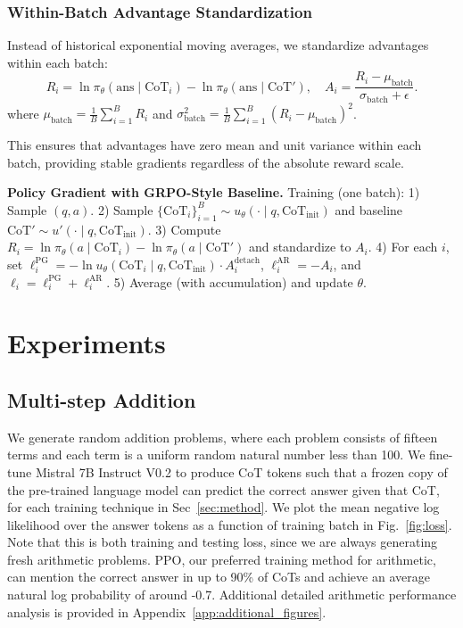 \documentclass{article} %
\begin{document}
\subsubsection{Within-Batch Advantage Standardization}
Instead of historical exponential moving averages, we standardize advantages within each batch:
\[R_i=\ln \pi_\theta(\text{ans} \mid \text{CoT}_i) - \ln \pi_\theta(\text{ans} \mid \text{CoT}'),\quad
A_i=\frac{R_i - \mu_{\text{batch}}}{\sigma_{\text{batch}} + \epsilon}.\]
where $\mu_{\text{batch}} = \frac{1}{B}\sum_{i=1}^B R_i$ and $\sigma_{\text{batch}}^2 = \frac{1}{B}\sum_{i=1}^B (R_i - \mu_{\text{batch}})^2$.

This ensures that advantages have zero mean and unit variance within each batch, providing stable gradients regardless of the absolute reward scale.

\noindent\textbf{Policy Gradient with GRPO-Style Baseline.} Training (one batch): 1) Sample $(q,a)$. 2) Sample $\{\text{CoT}_i\}_{i=1}^B\sim u_\theta(\cdot\mid q,\text{CoT}_{\text{init}})$ and baseline $\text{CoT}'\sim u'(\cdot\mid q,\text{CoT}_{\text{init}})$. 3) Compute $R_i=\ln \pi_\theta(a\mid \text{CoT}_i)-\ln \pi_\theta(a\mid \text{CoT}')$ and standardize to $A_i$. 4) For each $i$, set $\ell_i^{\text{PG}}=-\ln u_\theta(\text{CoT}_i\mid q,\text{CoT}_{\text{init}})\cdot A_i^{\text{detach}}$, $\ell_i^{\text{AR}}=-A_i$, and $\ell_i=\ell_i^{\text{PG}}+\ell_i^{\text{AR}}$. 5) Average (with accumulation) and update $\theta$.



\section{Experiments}
\label{sec:experiments}


\subsection{Multi-step Addition}
\label{subsec:solving}
We generate random addition problems, where each problem consists of fifteen terms and each term is a uniform random natural number less than 100. We fine-tune Mistral 7B Instruct V0.2 to produce CoT tokens such that a frozen copy of the pre-trained language model can predict the correct answer given that CoT, for each training technique in Sec~\ref{sec:method}. We plot the mean negative log likelihood over the answer tokens as a function of training batch in Fig.~\ref{fig:loss}. Note that this is both training and testing loss, since we are always generating fresh arithmetic problems. PPO, our preferred training method for arithmetic, can mention the correct answer in up to 90\% of CoTs and achieve an average natural log probability of around -0.7. Additional detailed arithmetic performance analysis is provided in Appendix~\ref{app:additional_figures}. 
\end{document}
